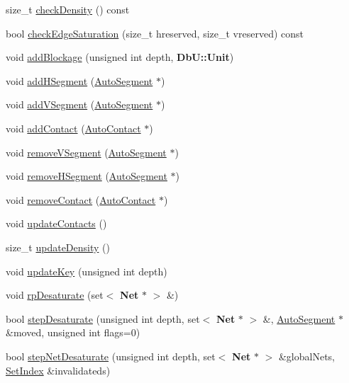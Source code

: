 \begin{DoxyCompactItemize}
\item 
size\-\_\-t \hyperlink{classKatabatic_1_1GCell_a8f5167eb40def2cfa878913743079f03}{check\-Density} () const 
\item 
bool \hyperlink{classKatabatic_1_1GCell_a0fb331311568ccb14d2005065575dc28}{check\-Edge\-Saturation} (size\-\_\-t hreserved, size\-\_\-t vreserved) const 
\item 
void \hyperlink{classKatabatic_1_1GCell_a1270eab34ac57f21c0286a5455044a0d}{add\-Blockage} (unsigned int depth, {\bf Db\-U\-::\-Unit})
\item 
void \hyperlink{classKatabatic_1_1GCell_a4aad7d6f7357fd7963aab91bc2019a1b}{add\-H\-Segment} (\hyperlink{classKatabatic_1_1AutoSegment}{Auto\-Segment} $\ast$)
\item 
void \hyperlink{classKatabatic_1_1GCell_a8aa815e9e99df8187e628f6ec9e9da77}{add\-V\-Segment} (\hyperlink{classKatabatic_1_1AutoSegment}{Auto\-Segment} $\ast$)
\item 
void \hyperlink{classKatabatic_1_1GCell_a2b84aab620bfca1064e988e94e7b9c59}{add\-Contact} (\hyperlink{classKatabatic_1_1AutoContact}{Auto\-Contact} $\ast$)
\item 
void \hyperlink{classKatabatic_1_1GCell_abe128484d8aa063198292a88c63f2bba}{remove\-V\-Segment} (\hyperlink{classKatabatic_1_1AutoSegment}{Auto\-Segment} $\ast$)
\item 
void \hyperlink{classKatabatic_1_1GCell_aff76aa96214c0efcf13186b8b3e5c852}{remove\-H\-Segment} (\hyperlink{classKatabatic_1_1AutoSegment}{Auto\-Segment} $\ast$)
\item 
void \hyperlink{classKatabatic_1_1GCell_aa052a9427fbd4185f00567a97770f80b}{remove\-Contact} (\hyperlink{classKatabatic_1_1AutoContact}{Auto\-Contact} $\ast$)
\item 
void \hyperlink{classKatabatic_1_1GCell_aa0beea2ceaa543503346967085036d1a}{update\-Contacts} ()
\item 
size\-\_\-t \hyperlink{classKatabatic_1_1GCell_a9b3455dce10eb98d0496175dd586528c}{update\-Density} ()
\item 
void \hyperlink{classKatabatic_1_1GCell_a11beff0f0bec06d0f3e080969516dfc3}{update\-Key} (unsigned int depth)
\item 
void \hyperlink{classKatabatic_1_1GCell_a8785f0ae0bc6de278281c353734b67b7}{rp\-Desaturate} (set$<$ {\bf Net} $\ast$ $>$ \&)
\item 
bool \hyperlink{classKatabatic_1_1GCell_a1256c28423a9a260d320e25b3fc1bf57}{step\-Desaturate} (unsigned int depth, set$<$ {\bf Net} $\ast$ $>$ \&, \hyperlink{classKatabatic_1_1AutoSegment}{Auto\-Segment} $\ast$\&moved, unsigned int flags=0)
\item 
bool \hyperlink{classKatabatic_1_1GCell_aab5b30c49b0453db495337931cf284a9}{step\-Net\-Desaturate} (unsigned int depth, set$<$ {\bf Net} $\ast$ $>$ \&global\-Nets, \hyperlink{classKatabatic_1_1GCell_aacb1c215b203bfba5729f135b3221d40}{Set\-Index} \&invalidateds)
\end{DoxyCompactItemize}
